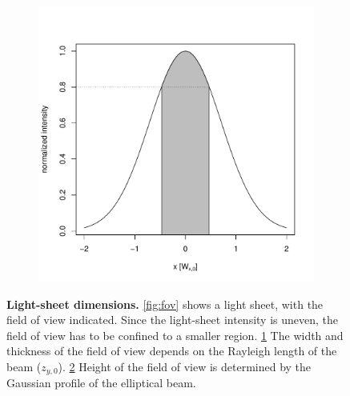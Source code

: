 \documentclass{diploma_style}
\begin{document}
\begin{figure}[b!]
\begin{subfigure}[b]{0.49\textwidth}
        \caption{}
        \label{fig:width}
    \end{subfigure}
    \begin{subfigure}[b]{0.49\textwidth}
        \centering
        \includegraphics[width=\textwidth]{figures/1_spim/height}
        \caption{}
        \label{fig:height}
    \end{subfigure}
    \caption{\textbf{Light-sheet dimensions.} \ref{fig:fov} shows a light sheet, with the field of view indicated. Since the light-sheet intensity is uneven, the field of view has to be confined to a smaller region. \ref{fig:width} The width and thickness of the field of view depends on the Rayleigh length of the beam ($z_{y,0}$). \ref{fig:height} Height of the field of view is determined by the Gaussian profile of the elliptical beam.}
    \label{fig:ls_dim}
\end{figure}
\end{document}
